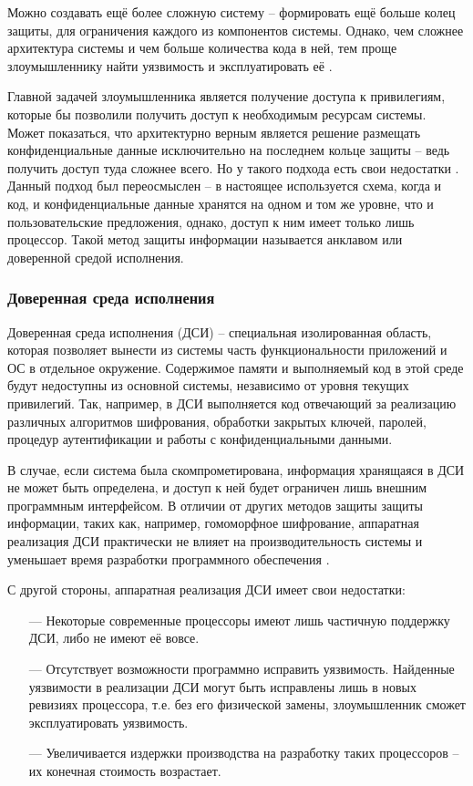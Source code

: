 Можно создавать ещё более сложную систему -- формировать ещё больше колец защиты, для ограничения каждого из компонентов системы. Однако, чем сложнее архитектура системы и чем больше количества кода в ней, тем проще злоумышленнику найти уязвимость и эксплуатировать её \cite{complex-systems}.

Главной задачей злоумышленника является получение доступа к привилегиям, которые бы позволили получить доступ к необходимым ресурсам системы. Может показаться, что архитектурно верным является решение размещать конфиденциальные данные исключительно на последнем кольце защиты -- ведь получить доступ туда сложнее всего. Но у такого подхода есть свои недостатки \cite{complex-systems}. Данный подход был переосмыслен -- в настоящее используется схема, когда и код, и конфиденциальные данные хранятся на одном и том же уровне, что и пользовательские предложения, однако, доступ к ним имеет только лишь процессор. Такой метод защиты информации называется анклавом или доверенной средой исполнения.

\subsubsection{Доверенная среда исполнения}

Доверенная среда исполнения (ДСИ) -- специальная изолированная область,  которая позволяет вынести из системы часть функциональности приложений и ОС в отдельное окружение. Содержимое памяти и выполняемый код в этой среде будут недоступны из основной системы, независимо от уровня текущих привилегий. Так, например, в ДСИ выполняется код отвечающий за реализацию различных алгоритмов шифрования, обработки закрытых ключей, паролей, процедур аутентификации и работы с конфиденциальными данными. 

В случае, если система была скомпрометирована, информация хранящаяся в ДСИ не может быть определена, и доступ к ней будет ограничен лишь внешним программным интерфейсом. В отличии от других методов защиты защиты информации, таких как, например, гомоморфное шифрование, аппаратная реализация ДСИ практически не влияет на производительность системы и уменьшает время разработки программного обеспечения \cite{tee}.

С другой стороны, аппаратная реализация ДСИ имеет свои недостатки:

\begin{itemize}
	\item [---] Некоторые современные процессоры имеют лишь частичную поддержку ДСИ, либо не имеют её вовсе.
	\item [---] Отсутствует возможности программно исправить уязвимость. Найденные уязвимости в реализации ДСИ могут быть исправлены лишь в новых ревизиях процессора, т.е. без его физической замены, злоумышленник сможет эксплуатировать уязвимость.
	\item [---] Увеличивается издержки производства на разработку таких процессоров -- их конечная стоимость возрастает.
\end{itemize}

